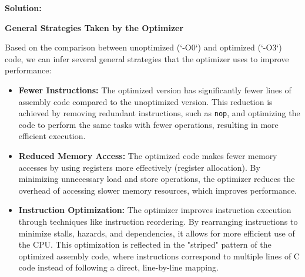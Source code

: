 \textbf{Solution:}

\textbf{General Strategies Taken by the Optimizer}

Based on the comparison between unoptimized (`-O0`) and optimized (`-O3`) code, we can infer several general strategies that the optimizer uses to improve performance:

\begin{itemize}
    \item \textbf{Fewer Instructions:}
    The optimized version has significantly fewer lines of assembly code compared to the unoptimized version. This reduction is achieved by removing redundant instructions, such as \texttt{nop}, and optimizing the code to perform the same tasks with fewer operations, resulting in more efficient execution.

    \item \textbf{Reduced Memory Access:}
    The optimized code makes fewer memory accesses by using registers more effectively (register allocation). By minimizing unnecessary load and store operations, the optimizer reduces the overhead of accessing slower memory resources, which improves performance.

    \item \textbf{Instruction Optimization:}
    The optimizer improves instruction execution through techniques like instruction reordering. By rearranging instructions to minimize stalls, hazards, and dependencies, it allows for more efficient use of the CPU. This optimization is reflected in the "striped" pattern of the optimized assembly code, where instructions correspond to multiple lines of C code instead of following a direct, line-by-line mapping.
\end{itemize}